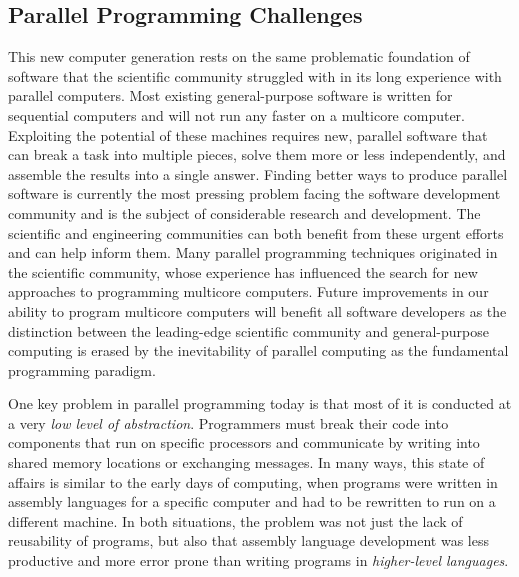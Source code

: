 \documentclass[twocolumn]{article}
\begin{document}
\subsection{Parallel Programming Challenges}
This new computer generation rests on the same problematic foundation of software
that the scientific community struggled with in its long experience with parallel
computers. Most existing general-purpose software is written for sequential
computers and will not run any faster on a multicore computer. Exploiting the potential
of these machines requires new, parallel software that can break a task into
multiple pieces, solve them more or less independently, and assemble the results
into a single answer. Finding better ways to produce parallel software is currently
the most pressing problem facing the software development community and is the
subject of considerable research and development.
The scientific and engineering communities can both benefit from these urgent
efforts and can help inform them. Many parallel programming techniques originated
in the scientific community, whose experience has influenced the search for
new approaches to programming multicore computers. Future improvements in
our ability to program multicore computers will benefit all software developers as
the distinction between the leading-edge scientific community and general-purpose
computing is erased by the inevitability of parallel computing as the fundamental
programming paradigm.

One key problem in parallel programming today is that most of it is conducted
at a very \emph{low level of abstraction}. Programmers must break their code into components
that run on specific processors and communicate by writing into shared
memory locations or exchanging messages. In many ways, this state of affairs is
similar to the early days of computing, when programs were written in assembly
languages for a specific computer and had to be rewritten to run on a different
machine. In both situations, the problem was not just the lack of reusability of programs,
but also that assembly language development was less productive and more
error prone than writing programs in \emph{higher-level languages}.
\end{document}
